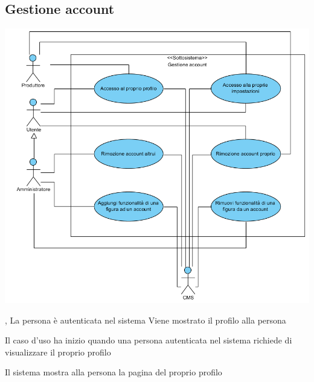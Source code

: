 \subsection{Gestione account}
\begin{center}
   \includegraphics[width=\textwidth]{assets/visualParadigm/GestioneAccount}
\end{center}
{, }
{La persona è autenticata nel sistema}
{Viene mostrato il profilo alla persona}
{\begin{enumCU}
	\item Il caso d'uso ha inizio quando una persona autenticata nel sistema richiede di visualizzare il proprio profilo
	\item Il sistema mostra alla persona la pagina del proprio profilo
\end{enumCU}}

\tabcuvspace

